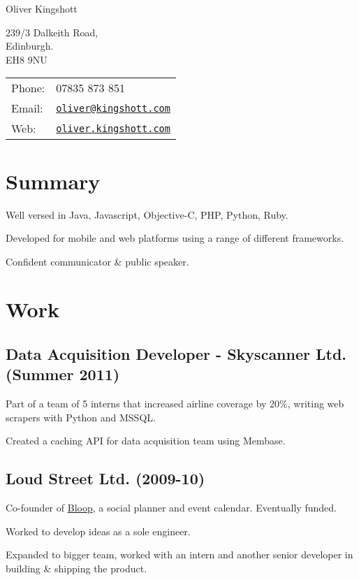 \documentclass[a4paper]{article}
\def\name{Oliver Kingshott}
\renewenvironment{itemize}{
  \begin{list}{}{
    \setlength{\leftmargin}{1.5em}
  }
}{
  \end{list}
}
\begin{document}
{\huge \name}

\vspace{0.25in}

\begin{minipage}{0.45\linewidth}
  239/3 Dalkeith Road, \\
  Edinburgh. \\
  EH8 9NU
\end{minipage}
\begin{minipage}{0.45\linewidth}
  \begin{tabular}{ll}
    Phone: & 07835 873 851 \\
    Email: & \href{mailto:oliver@kingshott.com}{\tt oliver@kingshott.com} \\
    Web: & \href{http://oliver.kingshott.com/}{\tt oliver.kingshott.com} \\
  \end{tabular}
\end{minipage}

\section*{Summary}
\begin{itemize}
  \item Well versed in Java, Javascript, Objective-C, PHP, Python, Ruby. 
  \item Developed for mobile and web platforms using a range of different frameworks.
  \item Confident communicator \& public speaker.
\end{itemize}

\section*{Work}

\subsection*{Data Acquisition Developer - Skyscanner Ltd. (Summer 2011)}
\begin{itemize}
  \item Part of a team of 5 interns that increased airline coverage by 20\%, writing web scrapers with Python and MSSQL.
  \item Created a caching API for data acquisition team using Membase.
\end{itemize}

\subsection*{Loud Street Ltd. (2009-10)}
\begin{itemize}
  \item Co-founder of \href{http://bloop.co}{Bloop}, a social planner and event calendar. Eventually funded.
  \item Worked to develop ideas as a sole engineer.
  \item Expanded to bigger team, worked with an intern and another senior developer in building \& shipping the product.
\end{itemize}
\end{document}
